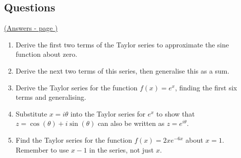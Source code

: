 \documentclass[../main.tex]{subfiles}
\begin{document}
\pagebreak
\hypertarget{taylorserieslink}{\subsection*{Questions}}
\hyperlink{taylorseriesanswers}{(Answers - page {\pageref*{Taylor series answers}})}

\label{taylor series}
\begin{enumerate}[itemsep=1cm]
    \item 
    Derive the first two terms of the Taylor series to approximate the sine function about zero.

    \item 
    Derive the next two terms of this series, then generalise this as a sum.

    \item
    Derive the Taylor series for the function $f(x)=e^x$, finding the first six terms and generalising.

    \item
    Substitute $x=i\theta$ into the Taylor series for $e^x$ to show that $z=\cos{(\theta)}+i \sin{(\theta)}$ can also be written as $z=e^{i \theta}$.

    \item
    Find the Taylor series for the function $f(x) = 2x e^{-6x}$ about $x = 1$. Remember to use $x-1$ in the series, not just $x$.


\end{enumerate}
\end{document}
